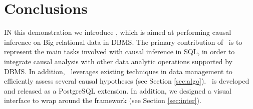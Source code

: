 
\section{Conclusions}
IN this demonstration we introduce \GSQL, which is aimed at
performing causal inference
on Big relational data in DBMS. The primary contribution of \GSQL\ is to represent the main tasks involved with causal inference in SQL, in order to integrate causal analysis with other data analytic operations supported by DBMS.
In addition, \GSQL\ leverages existing techniques
in data management to efficiently assess several causal hypotheses (see Section \ref{sec:algo}). \GSQL\ is developed and released as a PostgreSQL extension. In addition, we designed a visual interface to wrap around the framework (see Section \ref{sec:inter}).
